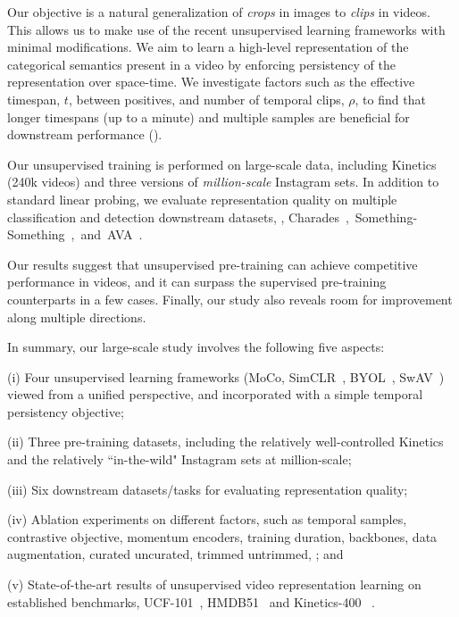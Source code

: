 \documentclass[final]{cvpr}
\begin{document}
Our objective is a natural generalization of \emph{crops} in images \cite{Dosovitskiy16a,Wu18} to \emph{clips} in videos. This allows us to make use of the recent unsupervised learning frameworks with minimal modifications. 
We aim to learn a high-level representation of the categorical semantics present in a video by enforcing persistency of the representation over space-time. We investigate factors such as the effective timespan, $t$, between positives, and number of temporal clips, $\rho$, to find that longer timespans (up to a minute) and multiple samples  are beneficial for downstream performance ().
	

Our unsupervised training is performed on large-scale data, including Kinetics \cite{Kay17} (240k videos) and three versions of \emph{million-scale} Instagram sets. In addition to standard linear probing, we  evaluate representation quality on multiple classification and detection downstream datasets, \eg, \mbox{Charades~\cite{Sigurdsson2016}, Something-Something \cite{ssv2}, and AVA \cite{Gu2018}.} 

Our results suggest that unsupervised pre-training can achieve competitive performance in videos, and it can surpass the supervised pre-training counterparts in a few cases. Finally, our study also reveals room for improvement along multiple directions.
	
In summary, our large-scale study involves the following five aspects:

(i) Four unsupervised learning frameworks (MoCo\cite{He20}, SimCLR~\cite{Chen20}, BYOL~\cite{Grill2020}, SwAV~\cite{Caron20}) viewed from a unified perspective, and incorporated with a simple temporal persistency objective;

(ii) Three pre-training datasets, including the relatively well-controlled Kinetics~\cite{Kay17} and the relatively ``in-the-wild" Instagram sets at million-scale;

(iii) Six downstream datasets/tasks for evaluating representation quality;

(iv) Ablation experiments on different factors, such as temporal samples, contrastive objective, momentum encoders, training duration, backbones, data augmentation, curated \vs uncurated, trimmed \vs untrimmed, \etc; and

(v) State-of-the-art results of unsupervised video representation learning on established benchmarks, UCF-101~\cite{Soomro12}, HMDB51~\cite{Kuehne11} and Kinetics-400~\cite{Kay17} . 	
	
\end{document}
